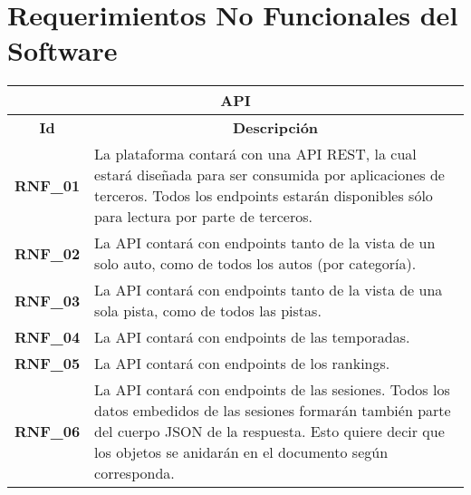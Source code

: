 \section{Requerimientos No Funcionales del Software}

\begin{center}
	\begin{tabular}{ | l | p{15cm} |}
		\hline
		\multicolumn{2}{|c|}{\textbf{API}} \\
		\hline
		\multicolumn{1}{|c|}{\textbf{Id}} & \multicolumn{1}{|c|}{\textbf{Descripción}} \\
		\hline
		{\textbf{RNF\_01}} & La plataforma contará con una API REST, la cual estará diseñada para ser consumida por aplicaciones de terceros. Todos los endpoints estarán disponibles sólo para lectura por parte de terceros. \\ \hline
		
		{\textbf{RNF\_02}} & La API contará con endpoints tanto de la vista de un solo auto, como de todos los autos (por categoría). \\ \hline
		
		{\textbf{RNF\_03}} & La API contará con endpoints tanto de la vista de una sola pista, como de todos las pistas. \\ \hline
		
		{\textbf{RNF\_04}} & La API contará con endpoints de las temporadas. \\ \hline
		
		{\textbf{RNF\_05}} & La API contará con endpoints de los rankings. \\ \hline
		
		{\textbf{RNF\_06}} & La API contará con endpoints de las sesiones. Todos los datos embedidos de las sesiones formarán también parte del cuerpo JSON de la respuesta. Esto quiere decir que los objetos se anidarán en el documento según corresponda.\\ \hline
	\end{tabular}
\end{center}

